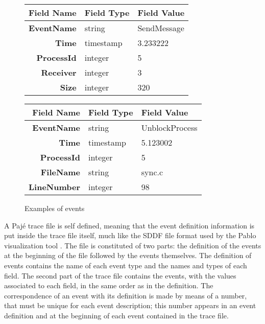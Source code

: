 \begin{figure}[htbp]
\begin{center}
\begin{tabular}{|>{\bf}rll|}
\hline
\textbf{Field Name} & \textbf{Field Type} & \textbf{Field Value} \\
\hline
EventName     & string    & SendMessage \\
Time          & timestamp & 3.233222    \\
ProcessId     & integer   & 5           \\
Receiver      & integer   & 3           \\
Size          & integer   & 320         \\
\hline
\end{tabular}
\quad\quad
\begin{tabular}{|>{\bf}rll|}
\hline
\textbf{Field Name} & \textbf{Field Type} & \textbf{Field Value} \\
\hline
EventName     & string    & UnblockProcess \\
Time          & timestamp & 5.123002    \\
ProcessId     & integer   & 5           \\
FileName      & string    & sync.c      \\
LineNumber    & integer   & 98          \\
\hline
\end{tabular}
\end{center}
\caption{Examples of events}
\label{f:event:table}
\end{figure}

A Pajé trace file is self defined, meaning that the event definition information is put inside the trace file itself, much like the SDDF file format used by the Pablo visualization tool \cite{sddf}.
The file is constituted of two parts: the definition of the events at the beginning of the file followed by the events themselves.
The definition of events contains the name of each event type and the names and types of each field.
The second part of the trace file contains the events, with the values associated to each field, in the same order as in the definition.
The correspondence of an event with its definition is made by means of a number, that must be unique for each event description; this number appears in an event definition and at the beginning of each event contained in the trace file.

